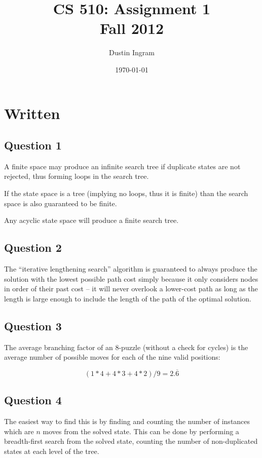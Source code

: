 \documentclass{article}
\title{CS 510: Assignment 1\\Fall 2012}
\author{Dustin Ingram}
\date{\today}
\begin{document}
\maketitle

\section{Written}

\subsection{Question 1}

A finite space may produce an infinite search tree if duplicate states are not
rejected, thus forming loops in the search tree.

If the state space is a tree (implying no loops, thus it is finite) than the
search space is also guaranteed to be finite.

Any acyclic state space will produce a finite search tree.

\subsection{Question 2}

The ``iterative lengthening search'' algorithm is guaranteed to always produce
the solution with the lowest possible path cost simply because it only considers
nodes in order of their past cost -- it will never overlook a lower-cost path as
long as the length is large enough to include the length of the path of the
optimal solution. 

\subsection{Question 3}

The average branching factor of an 8-puzzle (without a check for cycles) is the
average number of possible moves for each of the nine valid positions:

$$ (1*4 + 4*3 + 4*2)/9 = 2.\overline{6} $$ 

\subsection{Question 4}

The easiest way to find this is by finding and counting the number of instances
which are $n$ moves from the solved state. This can be done by performing a
breadth-first search from the solved state, counting the number of
non-duplicated states at each level of the tree.
\end{document}
